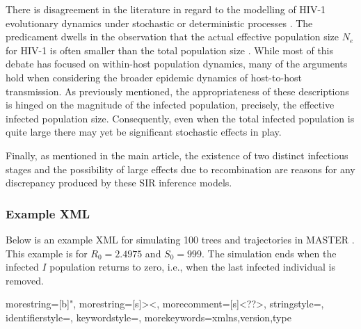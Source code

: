 \documentclass[10pt]{article}
\begin{document}
There is disagreement in the literature in regard to the modelling of HIV-1 evolutionary dynamics under stochastic or deterministic processes \citep{Nijhuis:1998,Rouzine:1999,Achaz:2004,Shriner:2004}.
The predicament dwells in the observation that the actual effective population size $N_e$ for HIV-1 is often smaller 
than the total population size \citep{Kouyos:2006}.
While most of this debate has focused on within-host population dynamics, many of the arguments hold when considering the broader epidemic dynamics of host-to-host transmission.
As previously mentioned, the  appropriateness of these descriptions is hinged on the magnitude of the infected population, precisely, the effective infected population size. Consequently, even when the total infected population is quite large there may yet be significant stochastic effects in play.

Finally, as mentioned in the main article, the existence of two distinct infectious stages and the possibility of large effects due to recombination are reasons for any discrepancy produced by these SIR inference models.

\subsubsection{Example XML} 

Below is an example XML for simulating 100 trees and trajectories in MASTER \citep{Vaughan:MASTER}.  This example is for $R_0=2.4975$ and $S_0=999$.  
The simulation ends when the infected $I$ population returns to zero, i.e., when the last infected individual is removed.


{
  morestring=[b]",
  morestring=[s]{>}{<},
  morecomment=[s]{<?}{?>},
  stringstyle=\color{black},
  identifierstyle=\color{darkblue},
  keywordstyle=\color{cyan},
  morekeywords={xmlns,version,type}%
}
\end{document}
